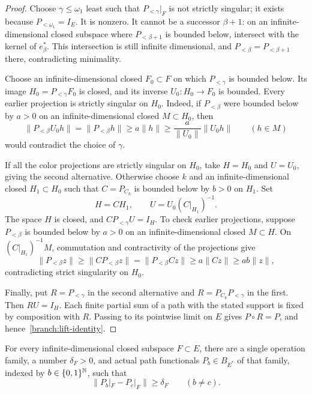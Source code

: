 \begin{proof}
Choose $\gamma\leq\omega_1$ least such that $P_{<\gamma}|_F$ is not
strictly singular; it exists because $P_{<\omega_1}=I_E$.
It is nonzero.  It cannot be a successor $\beta+1$: on an
infinite-dimensional closed subspace where $P_{<\beta+1}$ is bounded
below, intersect with the kernel of $e_\beta^*$.  This intersection is
still infinite dimensional, and $P_{<\beta}=P_{<\beta+1}$ there,
contradicting minimality.

Choose an infinite-dimensional closed $F_0\subset F$ on which
$P_{<\gamma}$ is bounded below.  Its image $H_0=P_{<\gamma}F_0$ is
closed, and its inverse $U_0:H_0\to F_0$ is bounded.  Every earlier
projection is strictly singular on $H_0$.  Indeed, if $P_{<\beta}$ were
bounded below by $a>0$ on an infinite-dimensional closed $M\subset H_0$,
then
\[
 \|P_{<\beta}U_0h\|=\|P_{<\beta}h\|
       \geq a\|h\|\geq \frac{a}{\|U_0\|}\|U_0h\|
       \qquad(h\in M)
\]
would contradict the choice of $\gamma$.

If all the color projections are strictly singular on $H_0$, take
$H=H_0$ and $U=U_0$, giving the second alternative.  Otherwise choose
$k$ and an infinite-dimensional closed $H_1\subset H_0$ such that
$C=P_{C_k}$ is bounded below by $b>0$ on $H_1$.  Set
\[
 H=CH_1,\qquad U=U_0(C|_{H_1})^{-1}.
\]
The space $H$ is closed, and $CP_{<\gamma}U=I_H$.
To check earlier projections, suppose $P_{<\beta}$ is bounded below by
$a>0$ on an infinite-dimensional closed $M\subset H$.  On
$(C|_{H_1})^{-1}M$, commutation and contractivity of the projections give
\[
 \|P_{<\beta}z\|\geq\|CP_{<\beta}z\|
       =\|P_{<\beta}Cz\|\geq a\|Cz\|\geq ab\|z\|,
\]
contradicting strict singularity on $H_0$.

Finally, put $R=P_{<\gamma}$ in the second alternative and
$R=P_{C_k}P_{<\gamma}$ in the first.  Then $RU=I_H$.  Each finite
partial sum of a path with the stated support is fixed by composition
with $R$.  Passing to its pointwise limit on $E$ gives $P\circ R=P$,
and hence~\eqref{branch:lift-identity}.
\end{proof}

\begin{theorem}\label{branch:separation}
For every infinite-dimensional closed subspace $F\subset E$, there are
a single operation family, a number $\delta_F>0$, and actual path
functionals $P_b\in B_{E^*}$ of that family, indexed by
$b\in\{0,1\}^{\mathbb N}$, such that
\[
          \|P_b|_F-P_c|_F\|\geq\delta_F
          \qquad(b\ne c).
\]
\end{theorem}


